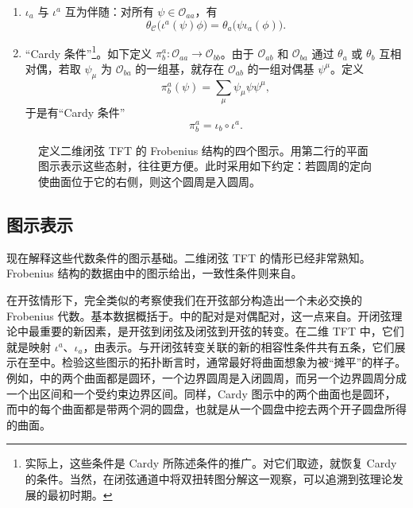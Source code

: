 \begin{enumerate}[label={},leftmargin=2.8em]
\begin{equation}\label{eq:2.9}
\iota_a(\phi)\psi=\psi\iota_b(\phi).
\end{equation}
\item[3d.]\label{cond:2.1.2.3d} $\iota_a$ 与 $\iota^a$ 互为伴随：对所有 $\psi\in\mathcal{O}_{aa}$，有
\begin{equation}\label{eq:2.10}
\theta_{\mathcal{C}}\bigl(\iota^a(\psi)\phi\bigr)=\theta_a\bigl(\psi\iota_a(\phi)\bigr).
\end{equation}
\item[3e.]\label{cond:2.1.2.3e} “Cardy 条件”\footnote{实际上，这些条件是 Cardy 所陈述条件的推广。对它们取迹，就恢复 Cardy 的条件。当然，在闭弦通道中将双扭转图分解这一观察，可以追溯到弦理论发展的最初时期。}。如下定义 $\pi_b^a\colon\mathcal{O}_{aa}\to\mathcal{O}_{bb}$。由于 $\mathcal{O}_{ab}$ 和 $\mathcal{O}_{ba}$ 通过 $\theta_a$ 或 $\theta_b$ 互相对偶，若取 $\psi_\mu$ 为 $\mathcal{O}_{ba}$ 的一组基，就存在 $\mathcal{O}_{ab}$ 的一组对偶基 $\psi^\mu$。定义
\begin{equation}\label{eq:2.11}
\pi_b^a(\psi)=\sum_\mu\psi_\mu\psi\psi^\mu,
\end{equation}
于是有“Cardy 条件”
\begin{equation}\label{eq:2.12}
\pi_b^a=\iota_b\circ\iota^a.
\end{equation}
\end{enumerate}

\begin{figure}[H]
\centering
{}
\caption{定义二维闭弦 TFT 的 Frobenius 结构的四个图示。用第二行的平面图示表示这些态射，往往更方便。此时采用如下约定：若圆周的定向使曲面位于它的右侧，则这个圆周是入圆周。}\label{fig:2.2}
\end{figure}

\subsection{图示表示}\label{sec:2.1.3}

现在解释这些代数条件的图示基础。二维闭弦 TFT 的情形已经非常熟知。Frobenius 结构的数据由中的图示给出，一致性条件则来自。

在开弦情形下，完全类似的考察使我们在开弦部分构造出一个未必交换的 Frobenius 代数。基本数据概括于。中的配对是对偶配对，这一点来自。开闭弦理论中最重要的新因素，是开弦到闭弦及闭弦到开弦的转变。在二维 TFT 中，它们就是映射 $\iota^a$、$\iota_a$，由表示。与开闭弦转变关联的新的相容性条件共有五条，它们展示在至中。检验这些图示的拓扑断言时，通常最好将曲面想象为被“摊平”的样子。例如，中的两个曲面都是圆环，一个边界圆周是入闭圆周，而另一个边界圆周分成一个出区间和一个受约束边界区间。同样，Cardy 图示中的两个曲面也是圆环，而中的每个曲面都是带两个洞的圆盘，也就是从一个圆盘中挖去两个开子圆盘所得的曲面。

